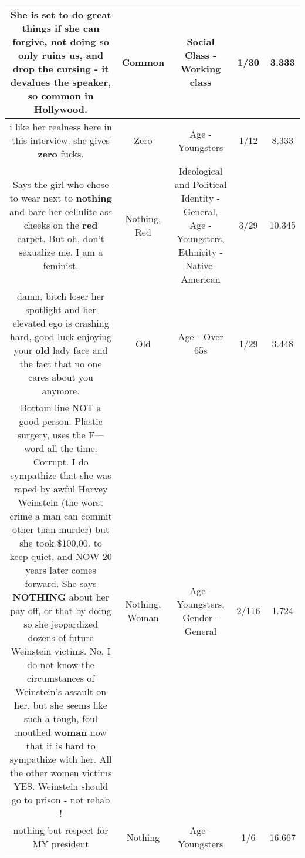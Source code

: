 \documentclass[11pt]{article}
\newlength\mylength
\begin{document}
\begin{center}
\begin{longtable}{|C{.65\mylength}|C{.30\mylength}|C{.12\mylength}|C{.12\mylength}|C{.12\mylength}|}
  \small She is set to do great things if she can forgive, not doing so only ruins us, and drop the cursing - it devalues the speaker, so \textbf{common} in Hollywood.\normalsize   & Common & Social Class - Working class & 1/30 & 3.333 \\  \hline
  \small i like her realness here in this interview. she gives \textbf{zero} fucks.\normalsize   & Zero & Age - Youngsters & 1/12 & 8.333 \\  \hline
  \small Says the girl who chose to wear next to \textbf{nothing} and bare her cellulite ass cheeks on the \textbf{r\textbf{ed}} carpet.  But oh, don't sexualize me, I am a feminist.\normalsize   & Nothing, Red &  Ideological and Political Identity - General, Age - Youngsters, Ethnicity - Native-American & 3/29 & 10.345 \\  \hline
  \small damn, bitch loser her spotlight and her elevated ego is crashing hard, good luck enjoying your \textbf{old} lady face and the fact that no one cares about you anymore.\normalsize   & Old & Age - Over 65s & 1/29 & 3.448 \\  \hline
  \small Bottom line NOT a good person. Plastic surgery, uses the F--- word all the time.  Corrupt.  I do sympathize that she was raped by awful Harvey Weinstein (the worst crime a man can commit other than murder) but she took \$100,00. to keep quiet, and NOW 20 years later comes forward.  She  says \textbf{NOTHING} about her pay off, or that by doing so she jeopardized dozens of future Weinstein victims. No, I do not know the circumstances of Weinstein's assault on her, but she seems like such a tough, foul mouthed \textbf{woman} now that  it is hard to sympathize with her. All the other women victims YES. Weinstein should go to prison - not rehab  !\normalsize   & Nothing, Woman & Age - Youngsters, Gender - General & 2/116 & 1.724 \\  \hline
  \small nothing but respect for MY president\normalsize   & Nothing & Age - Youngsters & 1/6 & 16.667 \\  \hline

\end{longtable}
\end{center}
\end{document}
